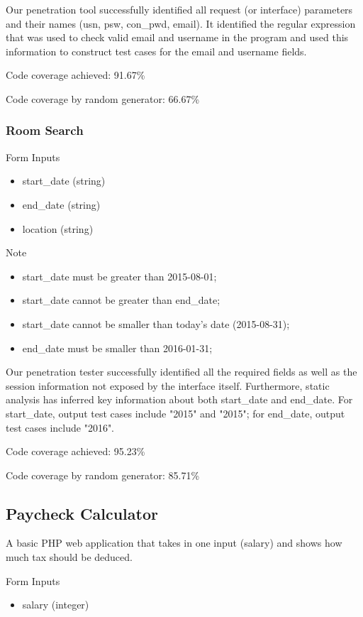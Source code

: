 Our penetration tool successfully identified all request (or interface) parameters and their names (usn, psw, con\_pwd, email). It identified the regular expression that was used to check valid email and username in the program and used this information to construct test cases for the email and username fields.

Code coverage achieved: 91.67\%

Code coverage by random generator: 66.67\%

\subsubsection{Room Search}
Form Inputs
\begin{itemize}
  \item start\_date (string)
  \item end\_date (string)
  \item location (string)
\end{itemize}

Note
\begin{itemize}
\item start\_date must be greater than 2015-08-01;
\item start\_date cannot be greater than end\_date;
\item start\_date cannot be smaller than today’s date (2015-08-31);
\item end\_date must be smaller than 2016-01-31;
\end{itemize}

Our penetration tester successfully identified all the required fields as well as the session information not exposed by the interface itself. Furthermore, static analysis has inferred key information about both start\_date and end\_date. For start\_date, output test cases include "2015" and "2015"; for end\_date, output test cases include "2016". 

Code coverage achieved: 95.23\%

Code coverage by random generator: 85.71\%

\subsection{Paycheck Calculator}
A basic PHP web application that takes in one input (salary) and shows how much tax should be deduced.

Form Inputs
\begin{itemize}
  \item salary (integer)
\end{itemize}

